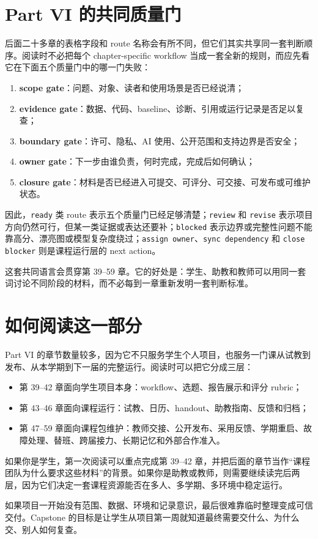 \section*{Part VI 的共同质量门}

后面二十多章的表格字段和 route 名称会有所不同，但它们其实共享同一套判断顺序。阅读时不必把每个 chapter-specific workflow 当成一套全新的规则，而应先看它在下面五个质量门中的哪一门失败：

\begin{enumerate}
    \item \textbf{scope gate}：问题、对象、读者和使用场景是否已经说清；
    \item \textbf{evidence gate}：数据、代码、baseline、诊断、引用或运行记录是否足以复查；
    \item \textbf{boundary gate}：许可、隐私、AI 使用、公开范围和支持边界是否安全；
    \item \textbf{owner gate}：下一步由谁负责，何时完成，完成后如何确认；
    \item \textbf{closure gate}：材料是否已经进入可提交、可评分、可交接、可发布或可维护状态。
\end{enumerate}

因此，\texttt{ready} 类 route 表示五个质量门已经足够清楚；\texttt{review} 和 \texttt{revise} 表示项目方向仍然可行，但某一类证据或表达还要补；\texttt{blocked} 表示边界或完整性问题不能靠高分、漂亮图或模型复杂度绕过；\texttt{assign owner}、\texttt{sync dependency} 和 \texttt{close blocker} 则是课程运行层的 next action。

这套共同语言会贯穿第 39--59 章。它的好处是：学生、助教和教师可以用同一套词讨论不同阶段的材料，而不必每到一章重新发明一套判断标准。

\section*{如何阅读这一部分}

Part VI 的章节数量较多，因为它不只服务学生个人项目，也服务一门课从试教到发布、从本学期到下一届的完整运行。阅读时可以把它分成三层：

\begin{itemize}
    \item 第 39--42 章面向学生项目本身：workflow、选题、报告展示和评分 rubric；
    \item 第 43--46 章面向课程运行：试教、日历、handout、助教指南、反馈和归档；
    \item 第 47--59 章面向课程包维护：教师交接、公开发布、采用反馈、学期重启、故障处理、替班、跨届接力、长期记忆和外部合作准入。
\end{itemize}

如果你是学生，第一次阅读可以重点完成第 39--42 章，并把后面的章节当作“课程团队为什么要求这些材料”的背景。如果你是助教或教师，则需要继续读完后两层，因为它们决定一套课程资源能否在多人、多学期、多环境中稳定运行。

\begin{protip}
如果项目一开始没有范围、数据、环境和记录意识，最后很难靠临时整理变成可信交付。Capstone 的目标是让学生从项目第一周就知道最终需要交什么、为什么交、别人如何复查。
\end{protip}
